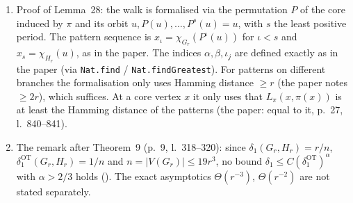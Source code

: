 \documentclass[10pt,a4paper]{article}
\newcommand{\lean}[1]{\textcolor{blue!50!black}{\texttt{\detokenize{#1}}}}
\begin{document}
\begin{enumerate}[leftmargin=*]
\item Proof of Lemma~28: the walk is formalised via the permutation $P$ of the core induced by $\pi$ and its orbit $u,P(u),\dots,P^{s}(u)=u$, with $s$ the least positive period. The pattern sequence is $x_\iota=\chi_{G_r}(P^\iota(u))$ for $\iota<s$ and $x_s=\chi_{H_r}(u)$, as in the paper. The indices $\alpha,\beta,\iota_j$ are defined exactly as in the paper (via \texttt{Nat.find} / \texttt{Nat.findGreatest}). For patterns on different branches the formalisation only uses Hamming distance $\ge r$ (the paper notes $\ge2r$), which suffices. At a core vertex $x$ it only uses that $L_\pi(x,\pi(x))$ is at least the Hamming distance of the patterns (the paper: equal to it, p.~27, l.~840--841).
\item The remark after Theorem~9 (p.~9, l.~318--320): since $\delta_1(G_r,H_r)=r/n$, $\delta_1^{\mathrm{OT}}(G_r,H_r)=1/n$ and $n=|V(G_r)|\le19r^3$, no bound $\delta_1\le C(\delta_1^{\mathrm{OT}})^\alpha$ with $\alpha>2/3$ holds (\lean{no_power_bound}). The exact asymptotics $\Theta(r^{-3})$, $\Theta(r^{-2})$ are not stated separately.
\end{enumerate}
\end{document}
